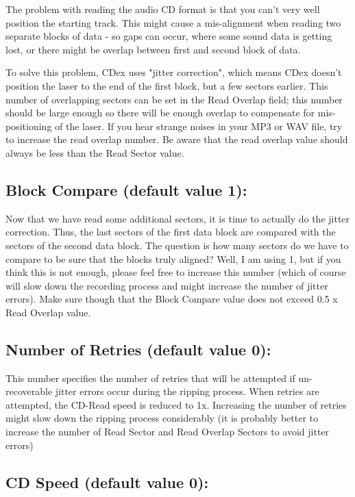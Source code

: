 The problem with reading the audio CD format is that you can't very well
position the starting track. This might cause a mis-alignment when reading
two separate blocks of data - so gaps can occur, where some sound
data is getting lost, or there might be overlap between first and second block
of data.

To solve this problem, CDex uses "jitter correction",
which means CDex doesn't position the laser to the end of the first block,
but a few sectors earlier. This number of overlapping sectors can be set
in the Read Overlap field; this number should be large enough so there will
be enough overlap to compensate for mis-positioning of the laser. If you hear
strange noises in your MP3 or WAV file, try to increase the read overlap number.
Be aware that the read overlap value should always be less than the Read Sector value.


\subsection{Block Compare (default value 1):}

Now that we have read some additional sectors, it is time to actually do the
jitter correction. Thus, the last sectors of the first data block are
compared with the sectors of the second data block. The question is
how many sectors do we have to compare to be sure that the blocks truly
aligned? Well, I am using 1, but if you think this is not enough, please feel
free to increase this number (which of course will slow down the recording
process and might increase the number of jitter errors). Make sure though that
the Block Compare  value does not exceed 0.5 x Read Overlap value.


\subsection{Number of Retries (default value 0):}

This number specifies the number of retries that will be attempted if un-recoverable
jitter errors occur during the ripping process. When retries are attempted, the 
CD-Read speed is reduced to 1x. Increasing the number of retries might slow down 
the ripping process considerably (it is probably better to increase the number 
of Read Sector and Read Overlap Sectors to avoid jitter errors)
 

\subsection{CD Speed (default value 0):}

